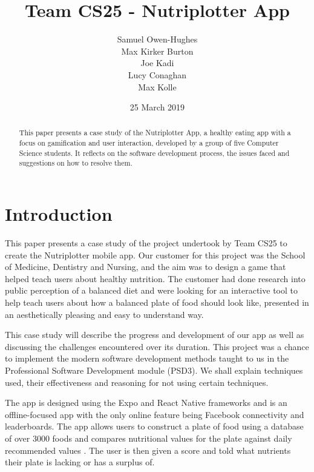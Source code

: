 \documentclass{l3proj}
\begin{document}
\setlength{\parindent}{10ex}
\title{Team CS25 - Nutriplotter App}

\author{Samuel Owen-Hughes \\
        Max Kirker Burton \\
        Joe Kadi \\
        Lucy Conaghan \\
        Max Kolle}

\date{25 March 2019}

\maketitle

\begin{abstract}
This paper presents a case study of the Nutriplotter App, a healthy eating app with a focus on gamification and user interaction, developed by a group of five Computer Science students. It reflects on the software development process, the issues faced and suggestions on how to resolve them.
\end{abstract}

\educationalconsent

\newpage
\section{Introduction}

This paper presents a case study of the project undertook by Team CS25 to create the Nutriplotter mobile app. Our customer for this project was the School of Medicine, Dentistry and Nursing, and the aim was to design a game that helped teach users about healthy nutrition. The customer had done research into public perception of a balanced diet and were looking for an interactive tool to help teach users about how a balanced plate of food should look like, presented in an aesthetically pleasing and easy to understand way.

This case study will describe the progress and development of our app as well as discussing the challenges encountered over its duration. This project was a chance to implement the modern software development methods taught to us in the Professional Software Development module (PSD3). We shall explain techniques used, their effectiveness and reasoning for not using certain techniques.

The app is designed using the Expo and React Native frameworks and is an offline-focused app with the only online feature being Facebook connectivity and leaderboards. The app allows users to construct a plate of food using a database of over 3000 foods \cite{mccancewiddowson} and compares nutritional values for the plate against daily recommended values \cite{drv}. The user is then given a score and told what nutrients their plate is lacking or has a surplus of. 
\end{document}
